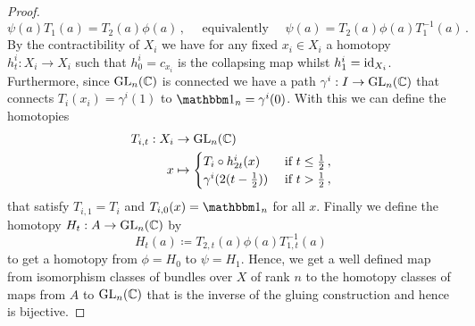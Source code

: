 \begin{proof}
\begin{equation*}
		\psi(a)T_1(a)=T_2(a)\phi(a)\,,\quad \text{ equivalently }\quad \psi(a)=T_2(a)\phi(a)T_1^{-1}(a)\,.
	\end{equation*} By the contractibility of $X_i$ we have for any fixed $x_i\in X_i$ a homotopy $h^i_t:X_i\to X_i$ such that $h^i_0=c_{x_i}$ is the collapsing map whilst $h^i_1=\operatorname{\mathrm{id}}_{X_i}$. Furthermore, since $\mathrm{GL}_n(\mathbb{C})$ is connected we have a path $\gamma^i: I\to \mathrm{GL}_n(\mathbb{C})$ that connects $T_i(x_i)=\gamma^i(1)$ to $\Idm_n=\gamma^i(0)$. With this we can define the homotopies
	\begin{align*}
		T_{i,t}: X_i&\to \mathrm{GL}_n(\mathbb{C})\\
		x &\mapsto \begin{cases}
			T_i\circ h^i_{2t}(x)& \text{ if }t\leq \frac{1}{2}\,,\\
			\gamma^i(2(t-\frac{1}{2}))& \text{ if }t > \frac{1}{2}\,,
		\end{cases}
	\end{align*} that satisfy $T_{i,1}=T_i$ and $T_{i,0}(x)=\Idm_n$ for all $x$. Finally we define the homotopy $H_t:A \to \mathrm{GL}_n(\mathbb{C})$ by
	\begin{equation*}
		H_t(a)\coloneq T_{2,t}(a)\phi(a)T_{1,t}^{-1}(a)\,
	\end{equation*} to get a homotopy from $\phi=H_0$ to $\psi=H_1$. Hence, we get a well defined map from isomorphism classes of bundles over $X$ of rank $n$ to the homotopy classes of maps from $A$ to $\mathrm{GL}_n(\mathbb{C})$ that is the inverse of the gluing construction and hence is bijective.
\end{proof}
